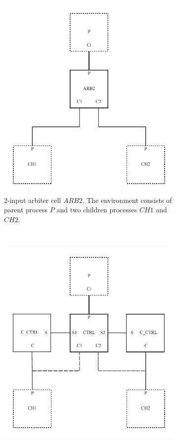 \documentclass[aer.tex]{subfiles}
\begin{document}
\begin{figure}
  \centering
  \begin{subfigure}[t]{.4\textwidth}
    \includegraphics[width=\textwidth]{img/transmitter/arb2.pdf}
    \caption{2-input arbiter cell $ARB2$. 
    The environment consists of parent process $P$ and two children processes $CH1$ and $CH2$.}
    \label{fig:arb2}
  \end{subfigure}
  ~
  \begin{subfigure}[t]{.4\textwidth}
    \includegraphics[width=\textwidth]{img/transmitter/ctrl.pdf}

\end{subfigure}
\end{figure}
\end{document}
